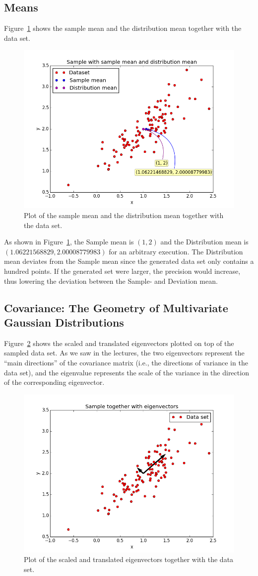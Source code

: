 \documentclass[a4paper]{article}
\begin{document}
\subsection{Means}
Figure~\ref{fig:samples_with_mean} shows the sample mean and the distribution mean together with the data set.

\begin{figure}[H]
  \centering
  \includegraphics[width=.6\linewidth]{figures/samples_with_mean.png}
  \caption{Plot of the sample mean and the distribution mean together with the data set.}
  \label{fig:samples_with_mean}
\end{figure}

As shown in Figure~\ref{fig:samples_with_mean}, the Sample mean is $(1, 2)$ and the Distribution mean is $(1.06221568829, 2.00008779983)$ for an arbitrary execution. The Distribution mean deviates from the Sample mean since the generated data set only contains a hundred points. If the generated set were larger, the precision would increase, thus lowering the deviation between the Sample- and Deviation mean.

\subsection{Covariance: The Geometry of Multivariate Gaussian Distributions}
Figure~\ref{fig:samples_with_eigenvectors} shows the scaled and translated eigenvectors plotted on top of the sampled data set. As we saw in the lectures, the two eigenvectors represent the ``main directions'' of the covariance matrix (i.e., the directions of variance in the data set), and the eigenvalue represents the scale of the variance in the direction of the corresponding eigenvector.

\begin{figure}[H]
  \centering
  \includegraphics[width=.6\linewidth]{figures/samples_with_eigenvectors.png}
  \caption{Plot of the scaled and translated eigenvectors together with the data set.}
  \label{fig:samples_with_eigenvectors}
\end{figure}
\end{document}
